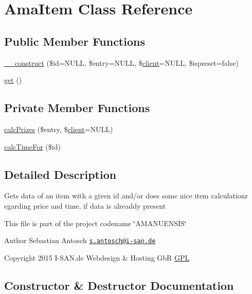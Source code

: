 \hypertarget{class_ama_item}{}\section{Ama\+Item Class Reference}
\label{class_ama_item}
\subsection*{Public Member Functions}
\begin{DoxyCompactItemize}
\item 
\hyperlink{class_ama_item_aaab12cd90b4dccbb52c145d20ad5ba7a}{\+\_\+\+\_\+construct} (\$id=N\+U\+L\+L, \$entry=N\+U\+L\+L, \$\hyperlink{classclient}{client}=N\+U\+L\+L, \$ispreset=false)
\item 
\hyperlink{class_ama_item_ac33ee765f5ad9f134540bac393721cfe}{get} ()
\end{DoxyCompactItemize}
\subsection*{Private Member Functions}
\begin{DoxyCompactItemize}
\item 
\hyperlink{class_ama_item_a5686932434d6d86e472ce3d6e68e74b4}{calc\+Prizes} (\$entry, \$\hyperlink{classclient}{client}=N\+U\+L\+L)
\item 
\hyperlink{class_ama_item_ad754c3635e6c74fba02bb32ee6b78688}{calc\+Time\+For} (\$id)
\end{DoxyCompactItemize}


\subsection{Detailed Description}
Gets data of an item with a given id and/or does some nice item calculationr egarding price and time, if data is alreaddy present

This file is part of the project codename \char`\"{}\+A\+M\+A\+N\+U\+E\+N\+S\+I\+S\char`\"{}

\begin{DoxyAuthor}{Author}
Sebastian Antosch \href{mailto:s.antosch@i-san.de}{\tt s.\+antosch@i-\/san.\+de} 
\end{DoxyAuthor}
\begin{DoxyCopyright}{Copyright}
2015 I-\/\+S\+A\+N.\+de Webdesign \& Hosting Gb\+R \hyperlink{}{G\+P\+L }
\end{DoxyCopyright}


\subsection{Constructor \& Destructor Documentation}
\hypertarget{class_ama_item_aaab12cd90b4dccbb52c145d20ad5ba7a}{}
